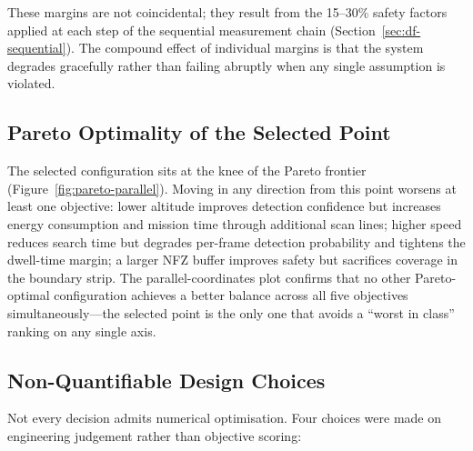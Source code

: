 \noindent These margins are not coincidental; they result from the 15--30\% safety factors applied at each step of the sequential measurement chain (Section~\ref{sec:df-sequential}). The compound effect of individual margins is that the system degrades gracefully rather than failing abruptly when any single assumption is violated.

\subsection{Pareto Optimality of the Selected Point}\label{sec:df-pareto}

The selected configuration sits at the knee of the Pareto frontier (Figure~\ref{fig:pareto-parallel}). Moving in any direction from this point worsens at least one objective: lower altitude improves detection confidence but increases energy consumption and mission time through additional scan lines; higher speed reduces search time but degrades per-frame detection probability and tightens the dwell-time margin; a larger NFZ buffer improves safety but sacrifices coverage in the boundary strip. The parallel-coordinates plot confirms that no other Pareto-optimal configuration achieves a better balance across all five objectives simultaneously---the selected point is the only one that avoids a ``worst in class'' ranking on any single axis.

\subsection{Non-Quantifiable Design Choices}\label{sec:df-qualitative}

Not every decision admits numerical optimisation. Four choices were made on engineering judgement rather than objective scoring:

